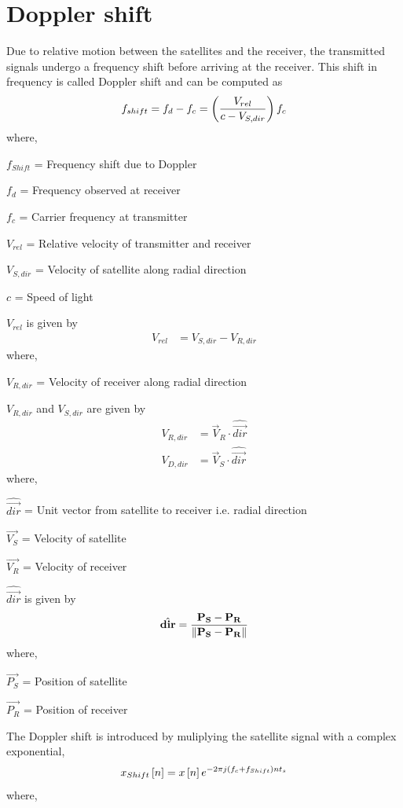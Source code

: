 \documentclass[10pt]{book}
\begin{document}
\section{Doppler shift}
Due to relative motion between the satellites and the receiver, the transmitted signals undergo a frequency shift before arriving at the receiver. This shift%
in frequency is called Doppler shift and can be computed as
\begin{equation}
    f_{shift} = f_{d}-f_{c} = \left(\frac{V_{rel}}{c-V_{S,dir}}\right)f_{c}  
\end{equation}
where,

$f_{Shift}$ = Frequency shift due to Doppler

$f_{d}$ = Frequency observed at receiver

$f_{c}$ = Carrier frequency at transmitter

$V_{rel}$ = Relative velocity of transmitter and receiver

$V_{S,dir}$ = Velocity of satellite along radial direction

$c$ = Speed of light

$V_{rel}$ is given by
\begin{align}
    V_{rel} &= V_{S,dir} - V_{R,dir}
\end{align}
where,

$V_{R,dir}$ = Velocity of receiver along radial direction

$V_{R,dir}$ and $V_{S,dir}$ are given by
\begin{align}
    V_{R,dir} &= \vec{V}_{R} \cdot \hat{\vec{dir}}\\
    V_{D,dir} &= \vec{V}_{S} \cdot \hat{\vec{dir}}
\end{align}
where,

$\hat{\vec{dir}}$ = Unit vector from satellite to receiver i.e. radial direction

$\vec{V_{S}}$ = Velocity of satellite

$\vec{V_{R}}$ = Velocity of receiver

$\hat{\vec{dir}}$ is given by
\begin{align}
    \hat{\mathbf{dir}} = \frac{\mathbf{P_{S}}-\mathbf{P_{R}}}{\left\lVert\mathbf{P_{S}}-\mathbf{P_{R}}\right\rVert}
\end{align}
where,

$\vec{P_{S}}$ = Position of satellite

$\vec{P_{R}}$ = Position of receiver


The Doppler shift is introduced by muliplying the satellite signal with a complex exponential,
\begin{equation}
    x_{Shift}{}\left[n\right] = x{}\left[n\right]e^{-2 \pi j \left(f_{c}+f_{Shift}\right) n t_{s}}
\end{equation}
where,
\end{document}
